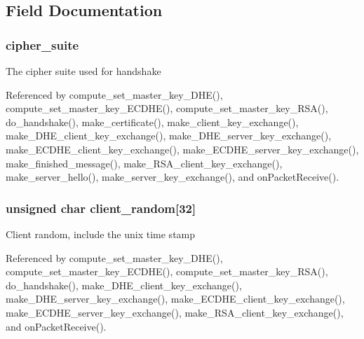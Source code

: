 \subsection{Field Documentation}
\subsubsection[{\texorpdfstring{cipher\+\_\+suite}{cipher_suite}}]{ cipher\+\_\+suite}\hypertarget{struct_t_l_s__parameters__t_af1d8ebe57a775be2b91550dbcacb2a58}{}\label{struct_t_l_s__parameters__t_af1d8ebe57a775be2b91550dbcacb2a58}
The cipher suite used for handshake 

Referenced by compute\+\_\+set\+\_\+master\+\_\+key\+\_\+\+D\+H\+E(), compute\+\_\+set\+\_\+master\+\_\+key\+\_\+\+E\+C\+D\+H\+E(), compute\+\_\+set\+\_\+master\+\_\+key\+\_\+\+R\+S\+A(), do\+\_\+handshake(), make\+\_\+certificate(), make\+\_\+client\+\_\+key\+\_\+exchange(), make\+\_\+\+D\+H\+E\+\_\+client\+\_\+key\+\_\+exchange(), make\+\_\+\+D\+H\+E\+\_\+server\+\_\+key\+\_\+exchange(), make\+\_\+\+E\+C\+D\+H\+E\+\_\+client\+\_\+key\+\_\+exchange(), make\+\_\+\+E\+C\+D\+H\+E\+\_\+server\+\_\+key\+\_\+exchange(), make\+\_\+finished\+\_\+message(), make\+\_\+\+R\+S\+A\+\_\+client\+\_\+key\+\_\+exchange(), make\+\_\+server\+\_\+hello(), make\+\_\+server\+\_\+key\+\_\+exchange(), and on\+Packet\+Receive().

\subsubsection[{\texorpdfstring{client\+\_\+random}{client_random}}]{\setlength{\rightskip}{0pt plus 5cm}unsigned char client\+\_\+random\mbox{[}32\mbox{]}}\hypertarget{struct_t_l_s__parameters__t_adbdca8d573a8e073ef16bf14229fb4c9}{}\label{struct_t_l_s__parameters__t_adbdca8d573a8e073ef16bf14229fb4c9}
Client random, include the unix time stamp 

Referenced by compute\+\_\+set\+\_\+master\+\_\+key\+\_\+\+D\+H\+E(), compute\+\_\+set\+\_\+master\+\_\+key\+\_\+\+E\+C\+D\+H\+E(), compute\+\_\+set\+\_\+master\+\_\+key\+\_\+\+R\+S\+A(), do\+\_\+handshake(), make\+\_\+\+D\+H\+E\+\_\+client\+\_\+key\+\_\+exchange(), make\+\_\+\+D\+H\+E\+\_\+server\+\_\+key\+\_\+exchange(), make\+\_\+\+E\+C\+D\+H\+E\+\_\+client\+\_\+key\+\_\+exchange(), make\+\_\+\+E\+C\+D\+H\+E\+\_\+server\+\_\+key\+\_\+exchange(), make\+\_\+\+R\+S\+A\+\_\+client\+\_\+key\+\_\+exchange(), and on\+Packet\+Receive().

